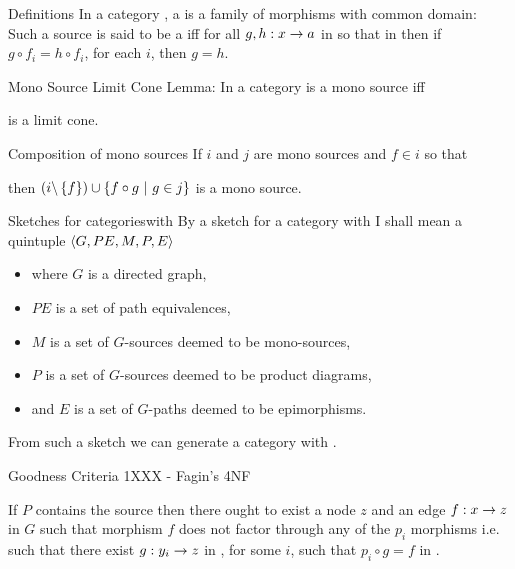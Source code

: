
\begin{frame}{Definitions} 
In a category \catc, a   is a family of morphisms with common domain: \\
\medskip
Such a source is said to be a   iff for all $g,h:x \rightarrow a$ in \catcw 
so that  
in \catcw then if $g \circ f_i = h \circ f_i$, for each $i$,  then $g=h$.
\end{frame}

\begin{frame}{Mono Source Limit Cone}  %
Lemma: In a category 
\scalebox{0.65}{

} is a mono source iff \\
\begin{center}
\scalebox{0.65}{

} 
is a limit cone.
\end{center}
\end{frame}

\begin{frame}{Composition of mono sources}
If $i$ and $j$ are mono sources and $f \in i$ so that
\begin{center}
\scalebox{0.65}{

}
\end{center}
then $(i \backslash \left\{f\right\}) \cup \left\{f \circ g \ \middle|\ g \in j\right\}$ is a mono source.
\end{frame}

\begin{frame}{Sketches for categories}{with \thirdstructure }
By a sketch for a category with \thirdstructure I shall mean a quintuple
$\langle G,PE,M,P,E\rangle$
\begin{itemize}
\item  where $G$ is a directed graph, 
\item  $PE$ is a set of path equivalences, 
\item  $M$ is a set of $G$-sources deemed to be mono-sources,
\item  $P$ is a set of $G$-sources deemed to be product diagrams, 
\item  and $E$ is a set of $G$-paths deemed to be epimorphisms.
\end{itemize}
\medskip
From such a sketch we can generate a category with \thirdstructure.  
\end{frame}

\begin{frame}{Goodness Criteria 1XXX - Fagin's 4NF}
\IfSforproductepimonoCwithRCwords

 If $P$ contains the source  
then there ought to exist a node $z$ and an edge $f: x \rightarrow z$ in $G$ such that morphism $f$ does not factor through any of the $p_i$ morphisms 
i.e. such that there exist $g: y_i \rightarrow z$ in \catcw, for some $i$, such that $p_i\circ g = f$ in \catc. 
\end{frame}


